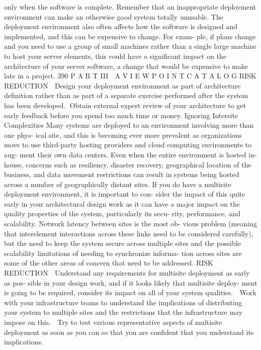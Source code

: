 only when the software is complete. Remember that an inappropriate
deployment environment can make an otherwise good system totally
unusable.
The deployment environment also often affects how the software is
designed and implemented, and this can be expensive to change. For exam-
ple, if plans change and you need to use a group of small machines rather
than a single large machine to host your server elements, this could have a
significant impact on the architecture of your server software, a change that
would be expensive to make late in a project.
390
 P A R T III  A V I E W P O I N T C A T A L O G
RISK REDUCTION
 Design your deployment environment as part of architecture definition
rather than as part of a separate exercise performed after the system has
been developed.
Obtain external expert review of your architecture to get early feedback
before you spend too much time or money.
Ignoring Intersite Complexities
Many systems are deployed to an environment involving more than one phys-
ical site, and this is becoming ever more prevalent as organizations move to
use third-party hosting providers and cloud computing environments to aug-
ment their own data centers. Even when the entire environment is hosted in-
house, concerns such as resiliency, disaster recovery, geographical location of
the business, and data movement restrictions can result in systems being
hosted across a number of geographically distant sites.
If you do have a multisite deployment environment, it is important to con-
sider the impact of this quite early in your architectural design work as it can
have a major impact on the quality properties of the system, particularly its secu-
rity, performance, and scalability. Network latency between sites is the most ob-
vious problem (meaning that interelement interactions across these links need to
be considered carefully), but the need to keep the system secure across multiple
sites and the possible scalability limitations of needing to synchronize informa-
tion across sites are some of the other areas of concern that need to be addressed.
RISK REDUCTION
 Understand any requirements for multisite deployment as early as pos-
sible in your design work, and if it looks likely that multisite deploy-
ment is going to be required, consider its impact on all of your system
qualities.
 Work with your infrastructure teams to understand the implications of
distributing your system to multiple sites and the restrictions that the
infrastructure may impose on this.
 Try to test various representative aspects of multisite deployment as soon
as you can so that you are confident that you understand its implications.
